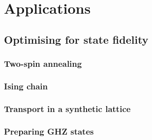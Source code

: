 \part{Applications}

\chapter{Optimising for state fidelity}

\section{Two-spin annealing}

\section{Ising chain}

\section{Transport in a synthetic lattice}

\section{Preparing GHZ states}